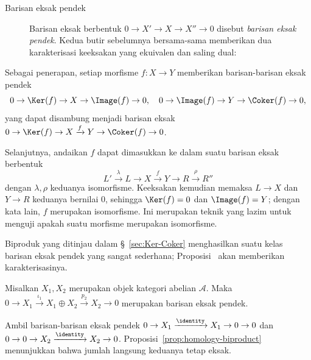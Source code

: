 \begin{description}
	\item[Barisan eksak pendek] Barisan eksak berbentuk
	$0 \to X' \to X \to X'' \to 0$ disebut \emph{barisan eksak pendek}.
	Kedua butir sebelumnya bersama-sama memberikan dua karakterisasi keeksakan
	yang ekuivalen dan saling dual:
\end{description}

Sebagai penerapan, setiap morfisme $f: X \to Y$ memberikan barisan-barisan
eksak pendek
\[ 0 \to \Ker(f) \to X \to \Image(f) \to 0, \quad 0 \to \Image(f) \to Y \to \Coker(f) \to 0, \]
yang dapat disambung menjadi barisan eksak
$0 \to \Ker(f) \to X \xrightarrow{f} Y \to \Coker(f) \to 0$.

Selanjutnya, andaikan $f$ dapat dimasukkan ke dalam suatu barisan eksak
berbentuk
\[ L' \xrightarrow{\lambda} L \to X \xrightarrow{f} Y \to R \xrightarrow{\rho} R'' \]
dengan $\lambda, \rho$ keduanya isomorfisme. Keeksakan kemudian memaksa
$L \to X$ dan $Y \to R$ keduanya bernilai $0$, sehingga
$\Ker(f) = 0$ dan $\Image(f) = Y$; dengan kata lain, $f$ merupakan
isomorfisme. Ini merupakan teknik yang lazim untuk menguji apakah suatu
morfisme merupakan isomorfisme.

Biproduk yang ditinjau dalam \S~\ref{sec:Ker-Coker} menghasilkan suatu kelas
barisan eksak pendek yang sangat sederhana;
Proposisi~
akan memberikan karakterisasinya.

\begin{proposisi}\label{prop:biproduct-ses}
	Misalkan $X_1, X_2$ merupakan objek kategori abelian $\mathcal{A}$.
	Maka
	$0 \to X_1 \xrightarrow{\iota_1} X_1 \oplus X_2 \xrightarrow{p_2} X_2 \to 0$
	merupakan barisan eksak pendek.
\end{proposisi}

\begin{bukti}
	Ambil barisan-barisan eksak pendek
	$0 \to X_1 \xrightarrow{\identity} X_1 \to 0 \to 0$ dan
	$0 \to 0 \to X_2 \xrightarrow{\identity} X_2 \to 0$.
	Proposisi~\ref{prop:homology-biproduct} menunjukkan bahwa jumlah langsung
	keduanya tetap eksak.
\end{bukti}
